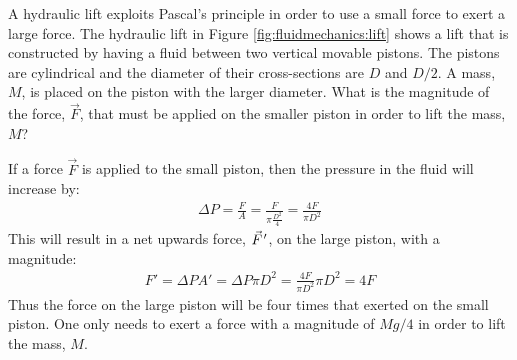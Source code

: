 \begin{example}{
A hydraulic lift exploits Pascal's principle in order to use a small force to exert a large force. The hydraulic lift in Figure \ref{fig:fluidmechanics:lift} shows a lift that is constructed by having a fluid between two vertical movable pistons. The pistons are cylindrical and the diameter of their cross-sections are $D$ and $D/2$. A mass, $M$, is placed on the piston with the larger diameter. What is the magnitude of the force, $\vec F$, that must be applied on the smaller piston in order to lift the mass, $M$?}

If a force $\vec F$ is applied to the small piston, then the pressure in the fluid will increase by:
\begin{align*}
\Delta P = \frac{F}{A}=\frac{F}{\pi \frac{D^2}{4}}=\frac{4F}{\pi D^2}
\end{align*}
This will result in a net upwards force, $\pvec F'$, on the large piston, with a magnitude:
\begin{align*}
F' = \Delta P A' = \Delta P \pi D^2 = \frac{4F}{\pi D^2} \pi D^2 = 4F
\end{align*}
Thus the force on the large piston will be four times that exerted on the small piston. One only needs to exert a force with a magnitude of $Mg/4$ in order to lift the mass, $M$.
\end{example}

